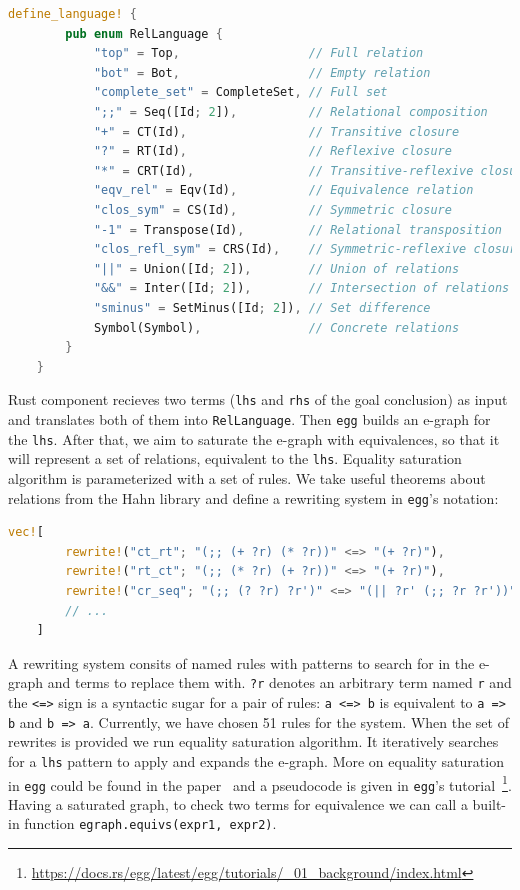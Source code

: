 \vspace{0.5cm}
\begin{lstlisting}[language=rust, style=colouredRust]
    define_language! {
        pub enum RelLanguage {
            "top" = Top,                  // Full relation
            "bot" = Bot,                  // Empty relation
            "complete_set" = CompleteSet, // Full set
            ";;" = Seq([Id; 2]),          // Relational composition
            "+" = CT(Id),                 // Transitive closure 
            "?" = RT(Id),                 // Reflexive closure
            "*" = CRT(Id),                // Transitive-reflexive closure
            "eqv_rel" = Eqv(Id),          // Equivalence relation 
            "clos_sym" = CS(Id),          // Symmetric closure
            "-1" = Transpose(Id),         // Relational transposition 
            "clos_refl_sym" = CRS(Id),    // Symmetric-reflexive closure
            "||" = Union([Id; 2]),        // Union of relations 
            "&&" = Inter([Id; 2]),        // Intersection of relations
            "sminus" = SetMinus([Id; 2]), // Set difference
            Symbol(Symbol),               // Concrete relations
        }
    }
\end{lstlisting}

Rust component recieves two terms (\texttt{lhs} and \texttt{rhs} of the goal conclusion) as input and translates both of them into \texttt{RelLanguage}. Then \texttt{egg} builds an e-graph for the \texttt{lhs}. After that, we aim to saturate the e-graph with equivalences, so that it will represent a set of relations, equivalent to the \texttt{lhs}. Equality saturation algorithm is parameterized with a set of rules. We take useful theorems about relations from the Hahn library and define a rewriting system in \texttt{egg}'s notation:

\vspace{0.5cm}
\begin{lstlisting}[language=rust, style=colouredRust]
    vec![
        rewrite!("ct_rt"; "(;; (+ ?r) (* ?r))" <=> "(+ ?r)"),
        rewrite!("rt_ct"; "(;; (* ?r) (+ ?r))" <=> "(+ ?r)"),
        rewrite!("cr_seq"; "(;; (? ?r) ?r')" <=> "(|| ?r' (;; ?r ?r'))"),
        // ...
    ]
\end{lstlisting}

A rewriting system consits of named rules with patterns to search for in the e-graph and terms to replace them with. \texttt{?r} denotes an arbitrary term named \texttt{r} and the \texttt{<=>} sign is a syntactic sugar for a pair of rules: \texttt{a <=> b} is equivalent to \texttt{a => b} and \texttt{b => a}. Currently, we have chosen 51 rules for the system. When the set of rewrites is provided we run equality saturation algorithm. It iteratively searches for a \texttt{lhs} pattern to apply and expands the e-graph. More on equality saturation in \texttt{egg} could be found in the paper~\cite{egg} and a pseudocode is given in \texttt{egg}'s tutorial~\footnote{\href{https://docs.rs/egg/latest/egg/tutorials/\_01\_background/index.html}{https://docs.rs/egg/latest/egg/tutorials/\_01\_background/index.html}}. Having a saturated graph, to check two terms for equivalence we can call a built-in function \texttt{egraph.equivs(expr1, expr2)}. 


